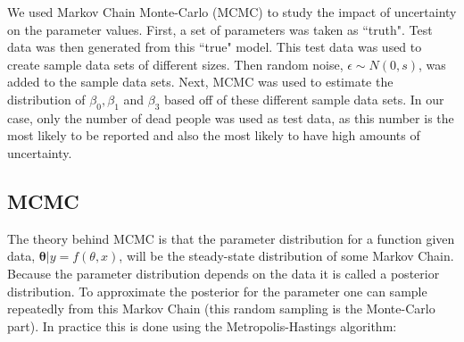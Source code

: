 \documentclass[10pt,a4paper]{article}
\begin{document}
We used Markov Chain Monte-Carlo (MCMC) to study the impact of uncertainty on the parameter values. First, a set of parameters was taken as ``truth". Test data was then generated from this ``true" model. This test data was used to create sample data sets of different sizes. Then random noise, $\epsilon \sim N(0,s)$, was added to the sample data sets. Next, MCMC was used to estimate the distribution of $\beta_0, \beta_1$ and $\beta_3$ based off of these different sample data sets. In our case, only the number of dead people was used as test data, as this number is the most likely to be reported and also the most likely to have high amounts of uncertainty.

\subsection*{MCMC}

The theory behind MCMC is that the parameter distribution for a function given data, $\mathbf{\theta}|y=f(\theta,x)$, will be the steady-state distribution of some Markov Chain. Because the parameter distribution depends on the data it is called a posterior distribution. To approximate the posterior for the parameter one can sample repeatedly from this Markov Chain (this random sampling is the Monte-Carlo part). In practice this is done using the Metropolis-Hastings algorithm:
\end{document}
